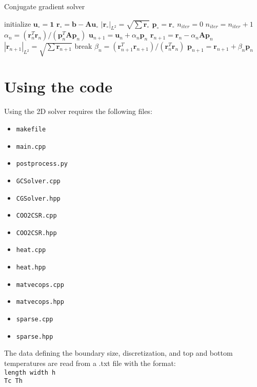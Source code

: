 \documentclass[12pt]{article}
\begin{document}
\begin{algorithm}
\caption{Conjugate gradient solver}
  \begin{algorithmic}
    \STATE initialize $\mathbf{u_\circ} = \mathbf{1}$
    \STATE $\mathbf{r_\circ} = \mathbf{b} - \mathbf{Au_\circ}$
    \STATE $|\mathbf{r_\circ}|_{L^2} = \sqrt{\sum{\mathbf{r_\circ}}}$
    \STATE $\mathbf{p_\circ} = \mathbf{r_\circ}$
    \STATE $n_{iter} = 0$
      \STATE $n_{iter} = n_{iter} + 1$
      \STATE $\alpha_n = (\mathbf{r}_n^T \mathbf{r}_n) / (\mathbf{p}_n^T 
              \mathbf{A p}_n)$
      \STATE $\mathbf{u}_{n+1} = \mathbf{u}_n + \alpha_n \mathbf{p}_n$
      \STATE $\mathbf{r}_{n+1} = \mathbf{r}_n - \alpha_n \mathbf{Ap}_n$
      \STATE $|\mathbf{r}_{n+1}|_{L^2} = \sqrt{\sum{\mathbf{r}_{n+1}}}$
        \STATE break
      \ENDIF
      \STATE $\beta_n = (\mathbf{r}_{n+1}^T\mathbf{r}_{n+1}) /
              (\mathbf{r}_n^T\mathbf{r}_n)$
      \STATE $\mathbf{p}_{n+1} = \mathbf{r}_{n+1} + \beta_n\mathbf{p}_n$
    \ENDWHILE
  \end{algorithmic}
\end{algorithm}

\section{Using the code}
Using the 2D solver requires the following files:
\begin{itemize}[noitemsep]
  \item\texttt{makefile}
  \item\texttt{main.cpp}
  \item\texttt{postprocess.py}
  \item\texttt{GCSolver.cpp}
  \item\texttt{CGSolver.hpp}
  \item\texttt{COO2CSR.cpp}
  \item\texttt{COO2CSR.hpp}
  \item\texttt{heat.cpp}
  \item\texttt{heat.hpp}
  \item\texttt{matvecops.cpp}
  \item\texttt{matvecops.hpp}
  \item\texttt{sparse.cpp}
  \item\texttt{sparse.hpp}
\end{itemize}

\noindent
The data defining the boundary size, discretization, and top and bottom temperatures are read from a .txt file with the format: \vspace{0.1in}\\
\noindent
\texttt{length width h} \\
\texttt{Tc Th} \\
\end{document}
